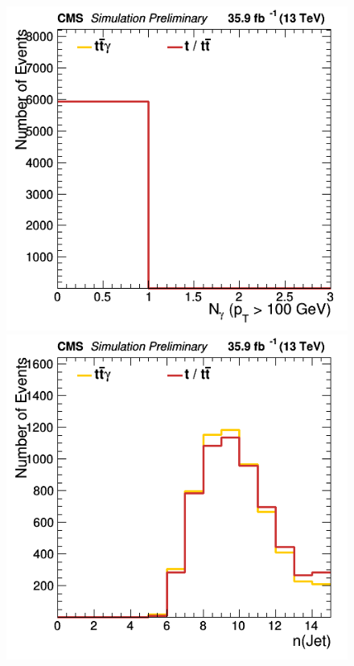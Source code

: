 \documentclass[11pt]{scrartcl}
\begin{document}
	\begin{figure}[H]
	\centering
	\begin{minipage}{.5\textwidth}
	  \centering
	  \includegraphics[width=0.75\linewidth]{figures/Notused/nHighPTPhotons.png}
	\end{minipage}%
	\begin{minipage}{.5\textwidth}
	  \centering
	  \includegraphics[width=0.75\linewidth]{figures/Notused/nJet.png}
	\end{minipage}
	\end{figure}
	
\end{document}
